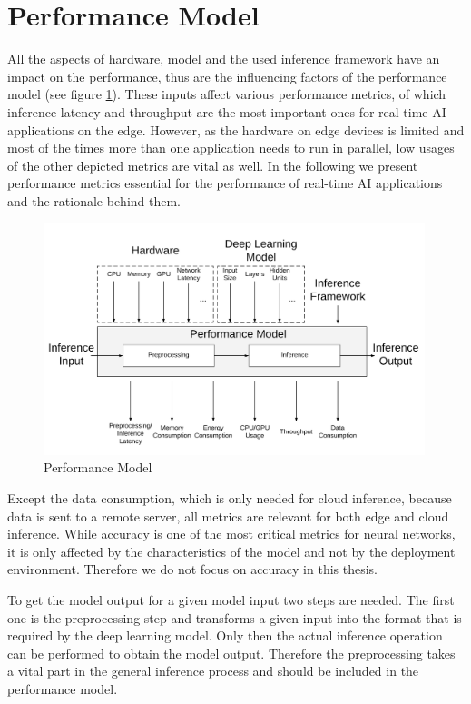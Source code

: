 \section{Performance Model}
All the aspects of hardware, model and the used inference framework have an impact on the performance, thus are the influencing factors of the performance model (see figure \ref{fig:perfmodel}). 
These inputs affect various performance metrics, of which inference latency and throughput are the most important ones for real-time AI applications on the edge. However, as the hardware on edge devices is limited and most of the times more than one application needs to run in parallel, low usages of the other depicted metrics are vital as well.
In the following we present performance metrics essential for the performance of real-time AI applications and the rationale behind them.
\begin{figure}[!htb]
\centering
\includegraphics[width=0.99\textwidth]{./Bilder/trade_offs.png}
\caption{Performance Model}
\label{fig:perfmodel}
\end{figure}

Except the data consumption, which is only needed for cloud inference, because data is sent to a remote server, all metrics are relevant for both edge and cloud inference.
While accuracy is one of the most critical metrics for neural networks, it is only affected by the characteristics of the model and not by the deployment environment. Therefore we do not focus on accuracy in this thesis.

To get the model output for a given model input two steps are needed. The first one is the preprocessing step and transforms a given input into the format that is required by the deep learning model. Only then the actual inference operation can be performed to obtain the model output. Therefore the preprocessing takes a vital part in the general inference process and should be included in the performance model.

